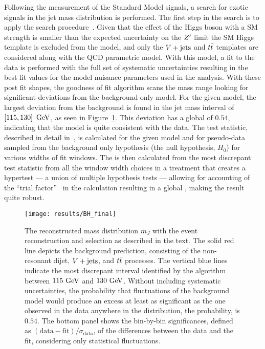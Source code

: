 Following the measurement of the Standard Model signals, a search for exotic signals in the \largeR jet mass distribution is performed.
The first step in the search is to apply the \BumpHunter{} search procedure~\cite{Aaltonen:2008vt,Choudalakis:2011qn}.
Given that the effect of the Higgs boson with a SM strength is smaller than the expected uncertainty on the $Z'$ limit the SM Higgs template is excluded from the model, and only the $V + \text{jets}$ and $t\bar{t}$ templates are considered along with the QCD parametric model.
With this model, a fit to the data is performed with the full set of systematic uncertainties resulting in the best fit values for the model nuisance parameters used in the analysis.
With these post fit shapes, the \BumpHunter{} goodness of fit algorithm scans the mass range looking for significant deviations from the background-only model.
For the given model, the largest deviation from the background is found in the \largeR jet mass interval of $\left[115,130\right]~\mathrm{GeV}$, as seen in Figure~\ref{fig:BumpHunter_scan}.
This deviation has a \BumpHunter{} global \pvalue{} of $0.54$, indicating that the model is quite consistent with the data.
The \BumpHunter{} test statistic, described in detail in~\cite{Choudalakis:2011qn}, is calculated for the given model and for pseudo-data sampled from the background only hypothesis (the null hypothesis, $H_{0}$) for various widths of fit windows.
The \BumpHunter{} \pvalue{} is then calculated from the most discrepant test statistic from all the window width choices in a treatment that creates a hypertest --- a union of multiple hypothesis tests --- allowing for accounting of the ``trial factor''~\cite{Gross:2010qma} in the calculation resulting in a global \pvalue{}, making the result quite robust.\\

\begin{figure}[htbp]
 \centering
 \texttt{[image: results/BH\_final]}
 \caption{The reconstructed mass distribution $m_{J}$ with the event reconstruction and selection as described in the text.
  The solid red line depicts the background prediction, consisting of the non-resonant dijet, $V + \text{jets}$, and $t\bar{t}$ processes.
  The vertical blue lines indicate the most discrepant interval identified by the \BumpHunter{} algorithm between $115~\mathrm{GeV}$ and $130~\mathrm{GeV}$.
  Without including systematic uncertainties, the probability that fluctuations of the background model would produce an excess at least as significant as the one observed in the data anywhere in the distribution, the \BumpHunter{} probability, is $0.54$.
  The bottom panel shows the bin-by-bin significances, defined as $\left(\mathrm{data} - \mathrm{fit}\right)/\sigma_{\mathrm{data}}$, of the differences between the data and the fit, considering only statistical fluctuations.
 }
 \label{fig:BumpHunter_scan}
\end{figure}

